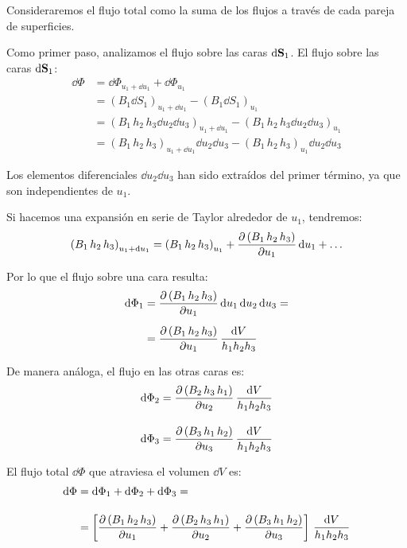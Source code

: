 \documentclass[12pt]{article}
\numberwithin{equation}{section}
\begin{document}
Consideraremos el flujo total como la suma de los flujos a través de cada pareja de superficies.
\par
Como primer paso, analizamos el flujo sobre las caras $\dd{\vb{S}_{1}}$. El flujo sobre las caras $\dd{\vb{S}_{1}}$:
\begin{align*}
\dd{\Phi} &= \dd{\Phi_{u_{1} + \dd{u_{1}}}} + \dd{\Phi_{u_{1}}} \\[0.5em] 
&= \left( B_{1} \dd{S_{1}} \right)_{u_{1} + \dd{u_{1}}} - \left( B_{1} \dd{S_{1}} \right)_{u_{1}} \\[0.5em] 
&= \left( B_{1} \, h_{2} \, h_{3} \dd{u_{2}} \dd{u_{3}} \right)_{u_{1} + \dd{u_{1}}} - \left( B_{1} \, h_{2} \, h_{3} \dd{u_{2}} \dd{u_{3}} \right)_{u_{1}} \\[0.5em] 
&= \left( B_{1} \, h_{2} \, h_{3} \right)_{u_{1} + \dd{u_{1}}} \dd{u_{2}} \dd{u_{3}} - \left( B_{1} \, h_{2} \, h_{3} \right)_{u_{1}} \dd{u_{2}} \dd{u_{3}}
\end{align*}
 
Los elementos diferenciales $\dd{u_{2}} \dd{u_{3}}$ han sido extraídos del primer término, ya que son independientes de $u_{1}$.
\par
Si hacemos una expansión en serie de Taylor alrededor de $u_{1}$, tendremos:
\begin{align*}
\left( B_{1} \, h_{2} \, h_{3} \right)_{u_{1} + \dd{u_{1}}} = \left( B_{1} \, h_{2} \, h_{3} \right)_{u_{1}} + \pdv{\left( B_{1} \, h_{2} \, h_{3} \right)}{u_{1}} \dd{u_{1}} + \ldots
\end{align*}

Por lo que el flujo sobre una cara resulta:
\begin{align*}
\dd{\Phi_{1}} &= \pdv{\left( B_{1} \, h_{2} \, h_{3} \right)}{u_{1}} \dd{u_{1}} \dd{u_{2}} \dd{u_{3}} = \\[0.5em] 
&= \pdv{\left( B_{1} \, h_{2} \, h_{3} \right)}{u_{1}} \, \dfrac{\dd{V}}{h_{1} h_{2} h_{3}}
\end{align*}

De manera análoga, el flujo en las otras caras es:
\begin{align*}
\dd{\Phi_{2}} &= \pdv{\left( B_{2} \, h_{3} \, h_{1} \right)}{u_{2}} \, \dfrac{\dd{V}}{h_{1} h_{2} h_{3}} \\[1em]
\dd{\Phi_{3}} &= \pdv{\left( B_{3} \, h_{1} \, h_{2} \right)}{u_{3}} \, \dfrac{\dd{V}}{h_{1} h_{2} h_{3}}
\end{align*}

El flujo total $\dd{\Phi}$ que atraviesa el volumen $\dd{V}$ es:
\begin{align*}
\dd{\Phi} &= \dd{\Phi_{1}} + \dd{\Phi_{2}} + \dd{\Phi_{3}} = \\[1em]
&= \left[ \pdv{\left( B_{1} \, h_{2} \, h_{3} \right)}{u_{1}} + \pdv{\left( B_{2} \, h_{3} \, h_{1} \right)}{u_{2}} + \pdv{\left( B_{3} \, h_{1} \, h_{2} \right)}{u_{3}} \right] \, \dfrac{\dd{V}}{h_{1} h_{2} h_{3}}
\end{align*}
\end{document}
